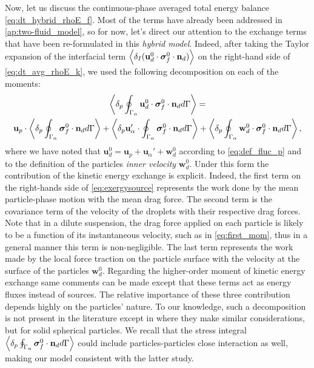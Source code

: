 Now, let us discuss the continuous-phase averaged total energy balance \eqref{eq:dt_hybrid_rhoE_f}. 
Most of the terms have already been addressed in \ref{ap:two-fluid_model}, so for now, let's direct our attention to the exchange terms that have been re-formulated in this \textit{hybrid model}. 
Indeed, after taking the Taylor expansion of the interfacial term $\left<\delta_I (\textbf{u}^0_d \cdot \bm{\sigma}_f^0 \cdot \textbf{n}_d)\right>$ on the right-hand side of \ref{eq:dt_avg_rhoE_k}, we used the following decomposition on each of the moments:
\begin{multline}
    \label{eq:exergysource}
    \pavg{ \intS{\textbf{u}^0_d \cdot \bm{\sigma}_f^0 \cdot \textbf{n}_d}}
    = \\
    \textbf{u}_p \cdot \pSavg{{\bm{\sigma}_f^0 \cdot \textbf{n}_d}}
    + \pavg{ \textbf{u}_\alpha' \cdot \intS{  \bm{\sigma}_f^0 \cdot \textbf{n}_d}}
    + \pavg{ \intS{\textbf{w}_d^0 \cdot \bm{\sigma}_f^0 \cdot \textbf{n}_d}},
\end{multline}
where we have noted that $\textbf{u}_d^0 = \textbf{u}_p + \textbf{u}_\alpha' +\textbf{w}_d^0$ according to \ref{eq:def_fluc_p} and to the definition of the particles \textit{inner velocity} $\textbf{w}_d^0$. 
Under this form the contribution of the kinetic energy exchange is explicit. 
Indeed, the first term on the right-hands side of \ref{eq:exergysource} represents the work done by the mean particle-phase motion with the mean drag force.
The second term is the covariance term of the velocity of the droplets with their respective drag forces.
Note that in a dilute suspension, the drag force applied on each particle is likely to be a function of its instantaneous velocity, such as in \ref{eq:first_mom}, thus in a general manner this term is non-negligible. 
The last term represents the work made by the local force traction on the particle surface with the velocity at the surface of the particles $\textbf{w}_d^0$.
Regarding the higher-order moment of kinetic energy exchange same comments can be made except that these terms act as energy fluxes instead of sources. 
The relative importance of these three contribution depends highly on the particles' nature. 
To our knowledge, such a decomposition is not present in the literature except in \citep[Chapter 2]{scorsim2021particle} where they make similar considerations, but for solid spherical particles.
We recall that the stress integral $\left<\delta_p \oint_{\Gamma_{\alpha}} \bm{\sigma}_f^0 \cdot \textbf{n}_d d\Gamma\right>$ could include particles-particles close interaction as well, making our model consistent with the latter study.

